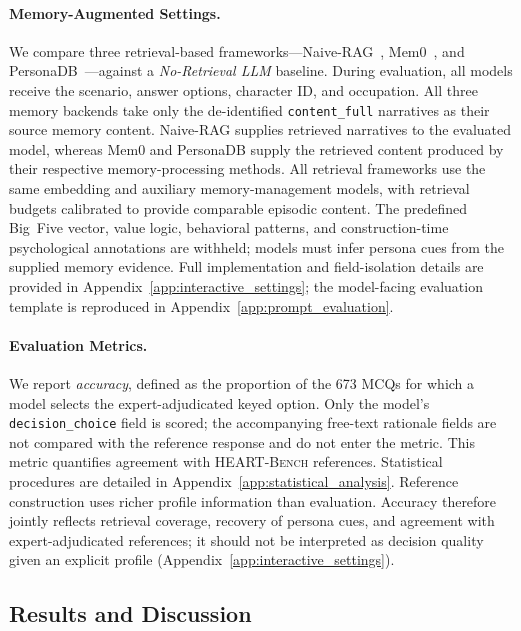 \documentclass[11pt]{article}
\newcommand{\ourbench}[0]{\textsc{HEART-Bench}\xspace}
\begin{document}
\paragraph{Memory-Augmented Settings.}
We compare three retrieval-based frameworks---Naive-RAG~\cite{lewis2020retrieval}, Mem0~\cite{chhikara2025mem0}, and PersonaDB~\cite{sun2025persona}---against a \textit{No-Retrieval LLM} baseline. During evaluation, all models receive the scenario, answer options, character ID, and occupation. All three memory backends take only the de-identified \texttt{content\_full} narratives as their source memory content. Naive-RAG supplies retrieved narratives to the evaluated model, whereas Mem0 and PersonaDB supply the retrieved content produced by their respective memory-processing methods. All retrieval frameworks use the same embedding and auxiliary memory-management models, with retrieval budgets calibrated to provide comparable episodic content. The predefined Big~Five vector, value logic, behavioral patterns, and construction-time psychological annotations are withheld; models must infer persona cues from the supplied memory evidence. Full implementation and field-isolation details are provided in Appendix~\ref{app:interactive_settings}; the model-facing evaluation template is reproduced in Appendix~\ref{app:prompt_evaluation}.

\paragraph{Evaluation Metrics.} We report \textit{accuracy}, defined as the proportion of the 673 MCQs for which a model selects the expert-adjudicated keyed option. Only the model's \texttt{decision\_choice} field is scored; the accompanying free-text rationale fields are not compared with the reference response and do not enter the metric. This metric quantifies agreement with \ourbench references. Statistical procedures are detailed in Appendix~\ref{app:statistical_analysis}.
Reference construction uses richer profile information than evaluation. Accuracy therefore jointly reflects retrieval coverage, recovery of persona cues, and agreement with expert-adjudicated references; it should not be interpreted as decision quality given an explicit profile (Appendix~\ref{app:interactive_settings}).

\subsection{Results and Discussion}
\end{document}
